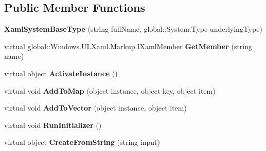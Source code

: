 \subsection*{Public Member Functions}
\begin{DoxyCompactItemize}
\item 
\mbox{\label{class_r_f_storage_1_1_r_f_storage___xaml_type_info_1_1_xaml_system_base_type_a86e911df27f8f1650397d36f910457ab}} 
{\bfseries Xaml\+System\+Base\+Type} (string full\+Name, global\+::\+System.\+Type underlying\+Type)
\item 
\mbox{\label{class_r_f_storage_1_1_r_f_storage___xaml_type_info_1_1_xaml_system_base_type_ae0827e1da67a1d60712bcbb991b64bfb}} 
virtual global\+::\+Windows.\+U\+I.\+Xaml.\+Markup.\+I\+Xaml\+Member {\bfseries Get\+Member} (string name)
\item 
\mbox{\label{class_r_f_storage_1_1_r_f_storage___xaml_type_info_1_1_xaml_system_base_type_a2f475ae2b2e0437b2cca018d6b6a50f9}} 
virtual object {\bfseries Activate\+Instance} ()
\item 
\mbox{\label{class_r_f_storage_1_1_r_f_storage___xaml_type_info_1_1_xaml_system_base_type_afc23b9f1eac9a5be88bbcf303cc58ffb}} 
virtual void {\bfseries Add\+To\+Map} (object instance, object key, object item)
\item 
\mbox{\label{class_r_f_storage_1_1_r_f_storage___xaml_type_info_1_1_xaml_system_base_type_a66478ccd1c021bc3bdbfe26020c76575}} 
virtual void {\bfseries Add\+To\+Vector} (object instance, object item)
\item 
\mbox{\label{class_r_f_storage_1_1_r_f_storage___xaml_type_info_1_1_xaml_system_base_type_a8b0d3832cd6e592f799446492bafc012}} 
virtual void {\bfseries Run\+Initializer} ()
\item 
\mbox{\label{class_r_f_storage_1_1_r_f_storage___xaml_type_info_1_1_xaml_system_base_type_ac8120674a1d39f33cde91dcc587026de}} 
virtual object {\bfseries Create\+From\+String} (string input)
\end{DoxyCompactItemize}
